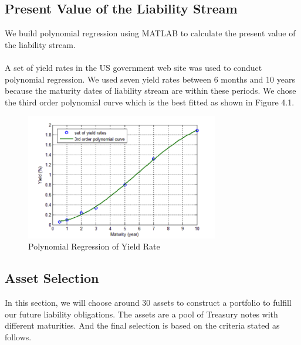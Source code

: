 \documentclass[oneside,12pt]{report}
\begin{document}
\subsection{Present Value of the Liability Stream}
\vspace{8pt}
We build polynomial regression using MATLAB to calculate the present value of the liability stream.\\
\\
A set of yield rates in the US government web site was used to conduct polynomial regression. We used seven yield rates between 6 months and 10 years because the maturity dates of liability stream are within these periods. We chose the third order polynomial curve which is the best fitted as shown in Figure 4.1.
\begin{figure}[htb]
    \begin{center}
        \includegraphics[width=0.75\textwidth]{prm.png}
    \end{center}
    \caption{Polynomial Regression of Yield Rate}
\end{figure}


\subsection{Asset Selection}
\vspace{8pt}
In this section, we will choose around 30 assets to construct a portfolio to fulfill our future liability obligations. The assets are a pool of Treasury notes with different maturities. And the final selection is based on the criteria stated as follows.\\
\end{document}
